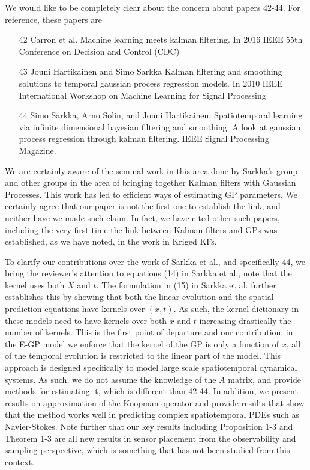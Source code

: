 \documentclass{letter}
\begin{document}
We would like to be completely clear about the concern about papers 42-44. For reference, these papers are
\begin{itemize}
	\item [42] Carron et al. Machine learning meets kalman filtering. In 2016 IEEE 55th Conference on Decision and Control (CDC)
	\item [43] Jouni Hartikainen and Simo Sarkka Kalman filtering and smoothing solutions to temporal gaussian process regression models. In 2010 IEEE International Workshop on Machine Learning for Signal Processing
	\item [44] Simo Sarkka, Arno Solin, and Jouni Hartikainen. Spatiotemporal learning via infinite dimensional bayesian filtering and smoothing: A look at gaussian process regression through kalman filtering. IEEE Signal Processing Magazine.
\end{itemize}
We are certainly aware of the seminal work in this area done by Sarkka's group and other groups in the area of bringing together Kalman filters with Gaussian Processes. This work has led to efficient ways of estimating GP parameters. We certainly agree that our paper is not the first one to establish the link, and neither have we made such claim. In fact, we have cited other such papers, including the very first time the link between Kalman filters and GPs was established, as we have noted, in the work in Kriged KFs.  

To clarify our contributions over  the work of Sarkka et al., and specifically 44, we bring the reviewer's attention to equations (14) in Sarkka et al., note that the kernel uses both $X$ and $t$. The formulation in (15) in Sarkka et al. further establishes this by showing that both the linear evolution and the spatial prediction equations have kernels over $(x,t)$. As such, the kernel dictionary in these models need to have kernels over both $x$ and $t$ increasing drastically the number of kernels. This is the first point of departure and our contribution, in the E-GP model we enforce that the kernel of the GP is only a function of $x$, all of the temporal evolution is restricted to the linear part of the model. This approach is designed specifically to model large scale spatiotemporal dynamical systems. As such, we do not assume the knowledge of the $A$ matrix, and provide methods for estimating it, which is different than 42-44. In addition, we present results on approximation of the Koopman operator and provide results that show that the method works well in predicting complex spatiotemporal PDEs such as Navier-Stokes.
Note further that our key results including Proposition 1-3 and Theorem 1-3 are all new results in  sensor placement from the observability and sampling perspective, which is something that has not been studied from this context. 
\end{document}
